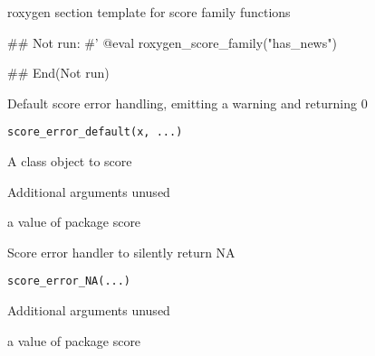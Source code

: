 \documentclass[a4paper]{book}
\begin{document}
%
\begin{Value}
roxygen section template for score family functions
\end{Value}
%
\begin{Examples}
\begin{ExampleCode}
## Not run: 
#' @eval roxygen_score_family("has_news")

## End(Not run)
\end{ExampleCode}
\end{Examples}
%
\begin{Description}
Default score error handling, emitting a warning and returning 0
\end{Description}
%
\begin{Usage}
\begin{verbatim}
score_error_default(x, ...)
\end{verbatim}
\end{Usage}
%
\begin{Arguments}
\begin{ldescription}
\item[\code{x}] A  class object to score

\item[\code{...}] Additional arguments unused
\end{ldescription}
\end{Arguments}
%
\begin{Value}
a value of package score
\end{Value}
%
\begin{Description}
Score error handler to silently return NA
\end{Description}
%
\begin{Usage}
\begin{verbatim}
score_error_NA(...)
\end{verbatim}
\end{Usage}
%
\begin{Arguments}
\begin{ldescription}
\item[\code{...}] Additional arguments unused
\end{ldescription}
\end{Arguments}
%
\begin{Value}
a value of package score
\end{Value}
\end{document}
